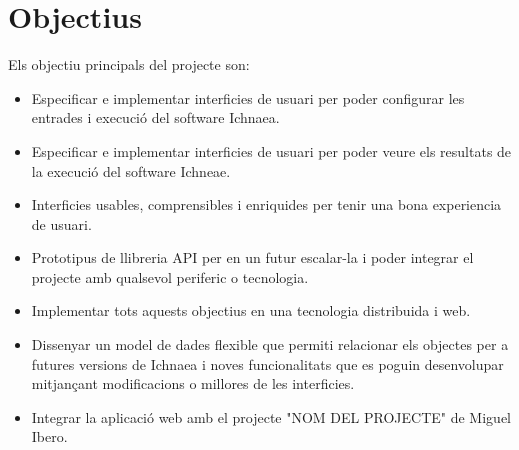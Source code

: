 \section{Objectius}
Els objectiu principals del projecte son:
\begin{itemize}
\item Especificar e implementar interficies de usuari per poder configurar les entrades i execuci\'{o} del software Ichnaea.
\item Especificar e implementar interficies de usuari per poder veure els resultats de la execuci\'{o} del software Ichneae.
\item Interficies usables, comprensibles i enriquides per tenir una bona experiencia de usuari.
\item Prototipus de llibreria API per en un futur escalar-la i poder integrar el projecte amb qualsevol periferic o tecnologia.
\item Implementar tots aquests objectius en una tecnologia distribuida i web.
\item Dissenyar un model de dades flexible que permiti relacionar els objectes per a futures versions de Ichnaea i noves funcionalitats que es poguin desenvolupar mitjançant modificacions o millores de les interficies.
\item Integrar la aplicaci\'{o} web amb el projecte "NOM DEL PROJECTE" de Miguel Ibero.
\end{itemize}


